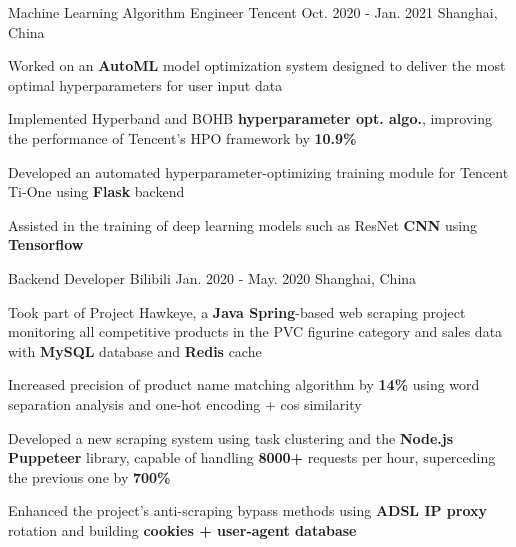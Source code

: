 

\begin{cventries}

  \cventry
    {Machine Learning Algorithm Engineer} %
    {Tencent} %
    {Oct. 2020 - Jan. 2021} %
    {Shanghai, China} %
    {
      \begin{cvitems} %
        \item {Worked on an \textbf{AutoML} model optimization system designed to deliver the most optimal hyperparameters for user input data}
        \item {Implemented Hyperband and BOHB \textbf{hyperparameter opt. algo.}, improving the performance of Tencent's HPO framework by \textbf{10.9\%}}
        \item {Developed an automated hyperparameter-optimizing training module for Tencent Ti-One using \textbf{Flask} backend}
        \item {Assisted in the training of deep learning models such as ResNet \textbf{CNN} using \textbf{Tensorflow}}
      \end{cvitems}
    }

  \cventry
    {Backend Developer} %
    {Bilibili} %
    {Jan. 2020 - May. 2020} %
    {Shanghai, China} %
    {
      \begin{cvitems} %
        \item {Took part of Project Hawkeye, a \textbf{Java Spring}-based web scraping project monitoring all competitive products in the PVC figurine category and sales data with \textbf{MySQL} database and \textbf{Redis} cache}
        \item {Increased precision of product name matching algorithm by \textbf{14\%} using word separation analysis and one-hot encoding + cos similarity}
        \item {Developed a new scraping system using task clustering and the \textbf{Node.js Puppeteer} library, capable of handling \textbf{8000+} requests per hour, superceding the previous one by \textbf{700\%}}
        \item {Enhanced the project's anti-scraping bypass methods using \textbf{ADSL IP proxy} rotation and building \textbf{cookies + user-agent database}}
      \end{cvitems}
    }


\end{cventries}
